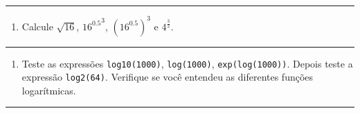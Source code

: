 \documentclass[]{book}
\providecommand{\tightlist}{%
  \setlength{\itemsep}{0pt}\setlength{\parskip}{0pt}}
\begin{document}
\begin{center}\rule{0.5\linewidth}{\linethickness}\end{center}

\begin{enumerate}
\def\labelenumi{\arabic{enumi}.}
\setcounter{enumi}{2}
\tightlist
\item
  Calcule \(\sqrt{16}\), \({16^{0.5}}^{3}\), \({(16^{0.5})}^{3}\) e
  \(4^{\frac{3}{2}}\).
\end{enumerate}

\begin{center}\rule{0.5\linewidth}{\linethickness}\end{center}

\begin{enumerate}
\def\labelenumi{\arabic{enumi}.}
\setcounter{enumi}{3}
\tightlist
\item
  Teste as expressões \texttt{log10(1000)}, \texttt{log(1000)},
  \texttt{exp(log(1000))}. Depois teste a expressão \texttt{log2(64)}.
  Verifique se você entendeu as diferentes funções logarítmicas.
\end{enumerate}

\begin{center}\rule{0.5\linewidth}{\linethickness}\end{center}
\end{document}
